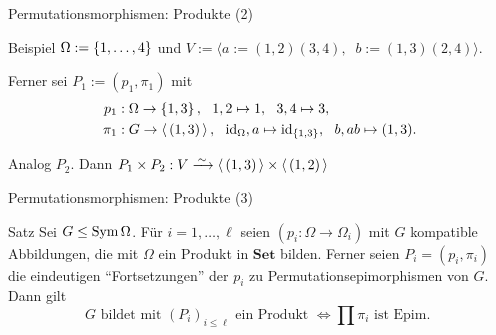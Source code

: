 
\begin{frame}{Permutationsmorphismen: Produkte (2)}
\begin{block}{Beispiel}
$\Omega :=  \left\{ 1, \ldots, 4 \right\} $ und
$V := \langle a := (1,2)(3,4),~$%
$b := (1,3)(2,4) \rangle$.

\begin{figure}[H]
\centering
{}
\end{figure}

Ferner sei
$P_1 := (p_1, \pi_1)$ mit
\begin{align*}
p_1 &: \Omega \rightarrow  \left\{ 1,3 \right\} ,~~
1,2 \mapsto 1, ~~ 3,4 \mapsto 3,
\\
\pi_1 &: G \rightarrow  \left\langle \, (1,3) \, \right\rangle ,~~
\operatorname{id}_\Omega, a \mapsto \operatorname{id}_{ \left\{ 1,3 \right\} },
~~b, ab \mapsto (1,3).
\end{align*}

Analog $P_2$.
Dann $P_1 \times P_2 : V \iso \gen{(1,3)} \times \gen{(1,2)}$
\end{block}
\end{frame}

\begin{frame}{Permutationsmorphismen: Produkte (3)}
\begin{block}{Satz}
Sei $G \leq \operatorname{Sym} \Omega$.
Für $i = 1, \ldots, \ell$
seien
$(p_i : \Omega \to \Omega_i)$
mit $G$ kompatible Abbildungen,
\pause
die mit $\Omega$ ein Produkt in
$\mathbf{Set}$ bilden.
\pause
Ferner seien
$P_i = (p_i, \pi_i)$ die eindeutigen ``Fortsetzungen'' der $p_i$ zu
Permutationsepimorphismen
von $G$.
\pause
Dann gilt
\[
G \text{ bildet mit } (P_i)_{i \leq \ell} \text{ ein Produkt }
\iff
\prod \pi_i \text{ ist Epim. }
\]
\end{block}
\end{frame}
